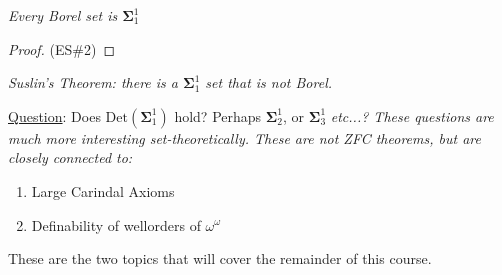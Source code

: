 \documentclass[]{article}
\newcommand{\om}{\omega}
\newcommand{\bosig}{\bm{\Sigma}}
\newcommand{\Det}{\textrm{Det}}
\begin{document}
\begin{remark*}[Proposition]
\emph{
    Every Borel set is $\bosig_1^1$
}    
\end{remark*}
\begin{proof}
    (ES\#2)
\end{proof}

\begin{remark*}[Corollary]
    \emph{
        Suslin's Theorem: there is a $\bosig_1^1$ set that is not Borel.
    }
\end{remark*}

\underline{Question}: Does $\Det(\bosig_1^1)$ hold? Perhaps $\bosig_2^1$, or $\bosig_3^1$ \it{etc...}? These questions are much more interesting set-theoretically. These are not ZFC theorems, but are closely connected to:
\begin{enumerate}
    \item Large Carindal Axioms
    \item Definability of wellorders of $\om^\om$
\end{enumerate}
These are the two topics that will cover the remainder of this course.
\end{document}
